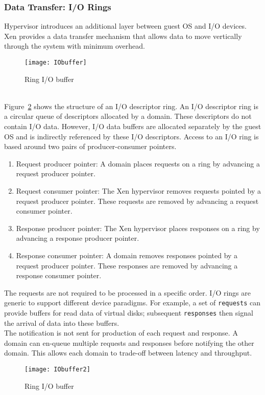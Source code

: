 \subsubsection*{Data Transfer: I/O Rings}
\label{subsec:io rings}
Hypervisor introduces an additional layer between guest OS and I/O devices. Xen provides a data transfer mechanism that allows data to move vertically through the system with minimum overhead. 
\begin{figure}[!ht]
\centering
\texttt{[image: IObuffer]}
\caption{Ring I/O buffer}
\label{fig:Ring buffer}
\end{figure}
\\[3mm]
Figure~\ref{fig:Ring buffer} shows the structure of an I/O descriptor ring. An I/O descriptor ring is a circular queue of descriptors allocated by a domain. These descriptors do not contain I/O data. However, I/O data buffers are allocated separately by the guest OS and is indirectly referenced by these I/O descriptors. Access to an I/O ring is based around two pairs of producer-consumer pointers.
\begin{enumerate}
\item Request producer pointer: A domain places requests on a ring by advancing a request producer pointer. 
\item Request consumer pointer: The Xen hypervisor removes requests pointed by a request producer pointer. These requests are removed by advancing a request consumer pointer.
\item Response producer pointer: The Xen hypervisor places responses on a ring by advancing a response producer pointer. 
\item Response consumer pointer: A domain removes responses pointed by a request producer pointer. These responses are removed by advancing a response consumer pointer.
\end{enumerate} 
The requests are not required to be processed in a specific order. I/O rings are generic to support different device paradigms. For example, a set of \texttt{requests} can provide buffers for read data of virtual disks; subsequent \texttt{responses} then signal the arrival of data into these buffers. 
\\[3mm]
The notification is not sent for production of each request and response. A domain can en-queue multiple requests and responses before notifying the other domain. This allows each domain to trade-off between latency and throughput.
\begin{figure}[!ht]
\centering
\texttt{[image: IObuffer2]}
\caption{Ring I/O buffer}
\label{fig:Ring buffer}
\end{figure}

